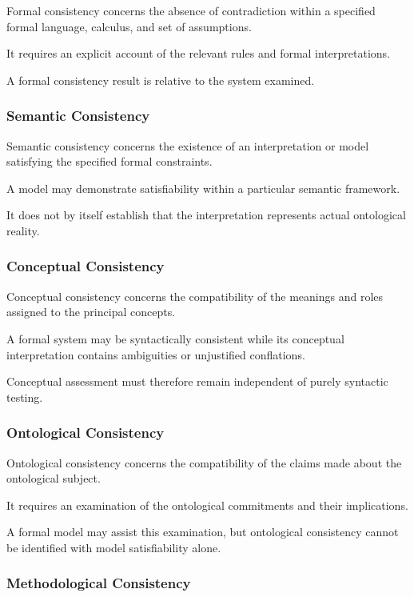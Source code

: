 Formal consistency concerns
the absence of contradiction
within a specified
formal language, calculus,
and set of assumptions.

It requires an
explicit account
of the relevant
rules and
formal interpretations.

A formal consistency
result is relative
to the system
examined.

\subsubsection{Semantic Consistency}

Semantic consistency
concerns the existence
of an interpretation
or model satisfying
the specified
formal constraints.

A model may
demonstrate satisfiability
within a particular
semantic framework.

It does not
by itself establish
that the interpretation
represents actual
ontological reality.

\subsubsection{Conceptual Consistency}

Conceptual consistency
concerns the compatibility
of the meanings
and roles assigned
to the principal
concepts.

A formal system
may be syntactically
consistent while
its conceptual
interpretation contains
ambiguities or
unjustified conflations.

Conceptual assessment
must therefore
remain independent
of purely syntactic
testing.

\subsubsection{Ontological Consistency}

Ontological consistency
concerns the compatibility
of the claims
made about
the ontological
subject.

It requires
an examination
of the ontological
commitments and
their implications.

A formal model
may assist
this examination,
but ontological
consistency cannot
be identified
with model
satisfiability alone.

\subsubsection{Methodological Consistency}

